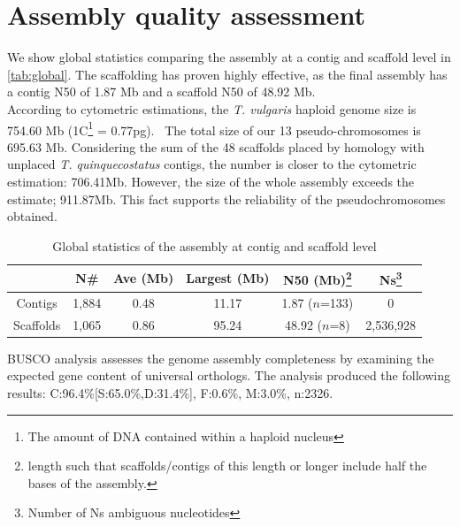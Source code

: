 \section*{Assembly quality assessment}

We show global statistics comparing the assembly at a contig and scaffold level in \autoref{tab:global}. The scaffolding has proven highly effective, as the final assembly has a contig N50 of 1.87 Mb and a scaffold N50 of 48.92 Mb. \\

According to cytometric estimations, the \textit{T. vulgaris} haploid genome size is 754.60 Mb (1C\footnote{The amount of DNA contained within a haploid nucleus} = 0.77pg).~\cite{marieCytometricExercisePlant1993,PlantDNACvalues} The total size of our 13 pseudo-chromosomes is 695.63 Mb. Considering the sum of the 48 scaffolds placed by homology with unplaced \textit{T. quinquecostatus} contigs, the number is closer to the cytometric estimation:  706.41Mb. However, the size of the whole assembly exceeds the estimate; 911.87Mb. This fact supports the reliability of the pseudochromosomes obtained. \\

\begin{table}[h!]
    \begin{minipage}{\linewidth}
    \renewcommand\thefootnote{\thempfootnote}
    \centering
    \begin{tabular}{@{}cccccc@{}}
        \toprule
        & N\#    & Ave (Mb) & Largest (Mb)& N50 (Mb)\footnote{length such that scaffolds/contigs of this length or longer include half the bases of the assembly.}     & Ns\footnote{Number of Ns ambiguous nucleotides}      \\ \midrule
        Contigs      & 1,884 & 0.48     & 11.17        & 1.87 ($n$=133) & 0       \\
        Scaffolds & 1,065 & 0.86     & 95.24        & 48.92 ($n$=8)  & 2,536,928 \\ \bottomrule
        \end{tabular}
        \caption{Global statistics of the assembly at contig and scaffold level}
        \label{tab:global}
\end{minipage}
\end{table}

BUSCO analysis assesses the genome assembly completeness by examining the expected gene content of universal orthologs. The analysis produced the following results: C:96.4\%[S:65.0\%,D:31.4\%], F:0.6\%, M:3.0\%, n:2326.\\


